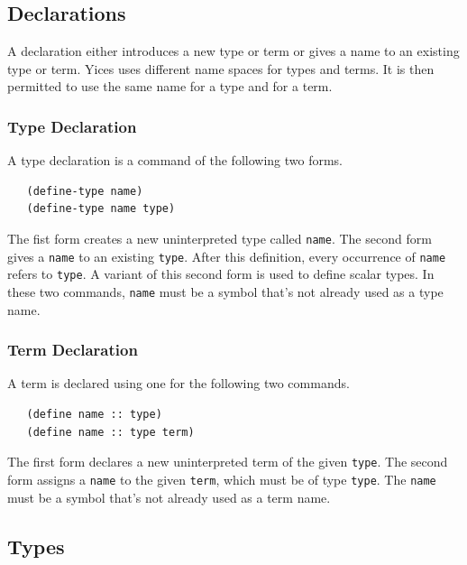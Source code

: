 \documentclass[11pt,twoside,fleqn,openright,titlepage]{cslreport}
\begin{document}
\subsection{Declarations}
\label{declarations}

A declaration either introduces a new type or term or gives a name to
an existing type or term. Yices uses different name spaces for types
and terms. It is then permitted to use the same name for a type and
for a term.


\subsubsection*{Type Declaration}

A type declaration is a command of the following two forms.
\begin{small}
\begin{verbatim}
   (define-type name)
   (define-type name type)
\end{verbatim}
\end{small}
The fist form creates a new uninterpreted type called
\texttt{name}. The second form gives a \texttt{name} to an
existing \texttt{type}. After this definition, every occurrence of
\texttt{name} refers to \texttt{type}. A variant of this second
form is used to define scalar types. In these two commands,
\texttt{name} must be a symbol that's not already used as a type
name.


\subsubsection*{Term Declaration}

A term is declared using one for the following two commands.
\begin{small}
\begin{verbatim}
   (define name :: type)
   (define name :: type term)
\end{verbatim}
\end{small}
The first form declares a new uninterpreted term of the given
\texttt{type}.  The second form assigns a \texttt{name} to the
given \texttt{term}, which must be of type \texttt{type}. The
\texttt{name} must be a symbol that's not already used as a term
name.



\subsection{Types}
\end{document}
